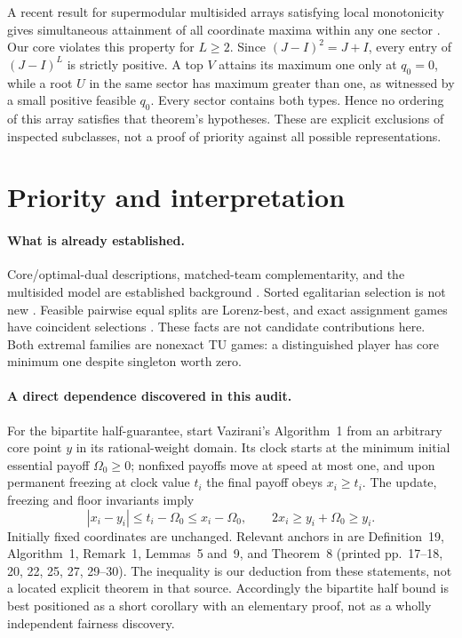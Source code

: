 \documentclass[11pt]{article}
\begin{document}
A recent result for supermodular multisided arrays satisfying local monotonicity
 gives simultaneous attainment of all coordinate maxima within any one sector
\cite[Theorem~3.2]{extrema}. Our core violates this property for $L\ge2$.
Since $(J-I)^2=J+I$, every entry of $(J-I)^L$ is strictly positive. A top $V$
attains its maximum one only at $q_0=0$, while a root $U$ in the same sector
has maximum greater than one, as witnessed by a small positive feasible $q_0$.
Every sector contains both types. Hence no ordering of this array satisfies
that theorem's hypotheses. These are explicit exclusions of inspected
subclasses, not a proof of priority against all possible representations.

\section{Priority and interpretation}\label{sec:priority}
\paragraph{What is already established.}
Core/optimal-dual descriptions, matched-team complementarity, and the
multisided model are established background \cite{quint,atay}.
Sorted egalitarian selection is not new \cite{klijn,vazirani}.
Feasible pairwise equal splits are Lorenz-best, and exact assignment games
have coincident selections \cite{llerena,solymosi-raghavan}. These facts are
not candidate contributions here. Both extremal families are nonexact TU games:
a distinguished player has core minimum one despite singleton worth zero.

\paragraph{A direct dependence discovered in this audit.}
For the bipartite half-guarantee, start Vazirani's Algorithm~1 from an arbitrary
core point $y$ in its rational-weight domain. Its clock starts at the minimum
initial essential payoff $\Omega_0\ge0$; nonfixed payoffs move at
speed at most one, and upon permanent freezing at clock value $t_i$ the final
payoff obeys $x_i\ge t_i$. The update, freezing and floor invariants imply
\[
 |x_i-y_i|\le t_i-\Omega_0\le x_i-\Omega_0,
 \qquad 2x_i\ge y_i+\Omega_0\ge y_i.
\]
Initially fixed coordinates are unchanged. Relevant anchors in
\cite{vazirani} are Definition~19, Algorithm~1, Remark~1, Lemmas~5 and~9,
and Theorem~8 (printed pp.~17--18, 20, 22, 25, 27, 29--30). The inequality is our deduction from these statements, not a
located explicit theorem in that source. Accordingly the bipartite half
bound is best positioned as a short corollary with an elementary proof,
not as a wholly independent fairness discovery.
\end{document}
